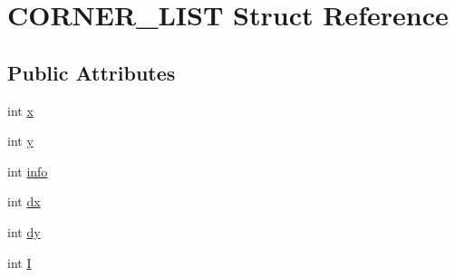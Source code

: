 \hypertarget{structCORNER__LIST}{\section{C\-O\-R\-N\-E\-R\-\_\-\-L\-I\-S\-T Struct Reference}
\label{structCORNER__LIST}
}
\subsection*{Public Attributes}
\begin{DoxyCompactItemize}
\item 
int \hyperlink{structCORNER__LIST_a26aa1a7fb76aa067ff75ec00f52a9270}{x}
\item 
int \hyperlink{structCORNER__LIST_a0ae16f5cb4b165c2010fb822dbf5e3dc}{y}
\item 
int \hyperlink{structCORNER__LIST_aec3658f1e09309d7944886a84c2a7c50}{info}
\item 
int \hyperlink{structCORNER__LIST_a0bf28acc256ebc09a331ad18635dc89a}{dx}
\item 
int \hyperlink{structCORNER__LIST_a12ee12316c81880eaf34117ad3cd01a6}{dy}
\item 
int \hyperlink{structCORNER__LIST_a3f0e11efe472ee83cdebd15321f2c5ce}{I}
\end{DoxyCompactItemize}


